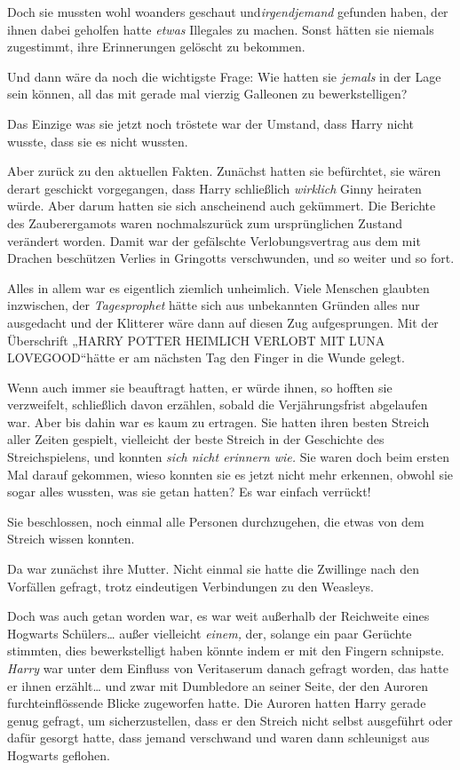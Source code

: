 {Doch sie mussten wohl woanders geschaut und\emph{irgendjemand} gefunden haben, der ihnen dabei geholfen hatte \emph{etwas} Illegales zu machen. Sonst hätten sie niemals zugestimmt, ihre Erinnerungen gelöscht zu bekommen.

Und dann wäre da noch die wichtigste Frage: Wie hatten sie \emph{jemals} in der Lage sein können, all das mit gerade mal vierzig Galleonen zu bewerkstelligen?

Das Einzige was sie jetzt noch tröstete war der Umstand, dass Harry nicht wusste, dass sie es nicht wussten.

Aber zurück zu den aktuellen Fakten. Zunächst hatten sie befürchtet, sie wären derart geschickt vorgegangen, dass Harry schließlich \emph{wirklich} Ginny heiraten würde. Aber darum hatten sie sich anscheinend auch gekümmert. Die Berichte des Zauberergamots waren nochmalszurück zum ursprünglichen Zustand verändert worden. Damit war der gefälschte Verlobungsvertrag aus dem mit Drachen beschützen Verlies in Gringotts verschwunden, und so weiter und so fort.

Alles in allem war es eigentlich ziemlich unheimlich. Viele Menschen glaubten inzwischen, der \emph{Tagesprophet} hätte sich aus unbekannten Gründen alles nur ausgedacht und der Klitterer wäre dann auf diesen Zug aufgesprungen. Mit der Überschrift „HARRY POTTER HEIMLICH VERLOBT MIT LUNA LOVEGOOD“hätte er am nächsten Tag den Finger in die Wunde gelegt.

Wenn auch immer sie beauftragt hatten, er würde ihnen, so hofften sie verzweifelt, schließlich davon erzählen, sobald die Verjährungsfrist abgelaufen war. Aber bis dahin war es kaum zu ertragen. Sie hatten ihren besten Streich aller Zeiten gespielt, vielleicht der beste Streich in der Geschichte des Streichspielens, und konnten \emph{sich nicht erinnern wie.} Sie waren doch beim ersten Mal darauf gekommen, wieso konnten sie es jetzt nicht mehr erkennen, obwohl sie sogar alles wussten, was sie getan hatten? Es war einfach verrückt!

Sie beschlossen, noch einmal alle Personen durchzugehen, die etwas von dem Streich wissen konnten.

Da war zunächst ihre Mutter. Nicht einmal sie hatte die Zwillinge nach den Vorfällen gefragt, trotz eindeutigen Verbindungen zu den Weasleys.

Doch was auch getan worden war, es war weit außerhalb der Reichweite eines Hogwarts Schülers… außer vielleicht \emph{einem,} der, solange ein paar Gerüchte stimmten, dies bewerkstelligt haben könnte indem er mit den Fingern schnipste. \emph{Harry} war unter dem Einfluss von Veritaserum danach gefragt worden, das hatte er ihnen erzählt… und zwar mit Dumbledore an seiner Seite, der den Auroren furchteinflössende Blicke zugeworfen hatte. Die Auroren hatten Harry gerade genug gefragt, um sicherzustellen, dass er den Streich nicht selbst ausgeführt oder dafür gesorgt hatte, dass jemand verschwand und waren dann schleunigst aus Hogwarts geflohen.

}
